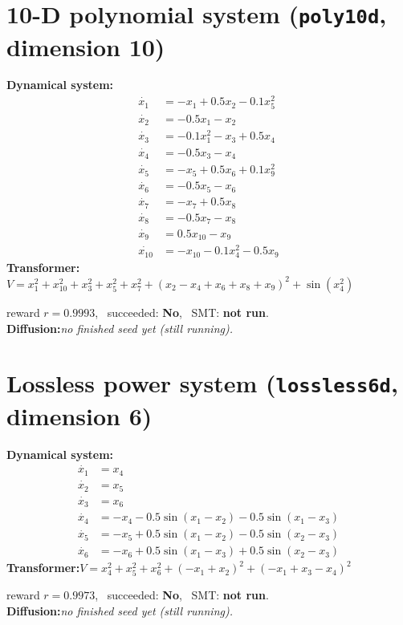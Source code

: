 \documentclass[11pt]{article}
\begin{document}
\section*{10-D polynomial system \quad (\texttt{poly10d}, dimension 10)}
\textbf{Dynamical system:}
\begin{align*}
\dot{x_{1}} &= - x_{1} + 0.5 x_{2} - 0.1 x_{5}^{2} \\
\dot{x_{2}} &= - 0.5 x_{1} - x_{2} \\
\dot{x_{3}} &= - 0.1 x_{1}^{2} - x_{3} + 0.5 x_{4} \\
\dot{x_{4}} &= - 0.5 x_{3} - x_{4} \\
\dot{x_{5}} &= - x_{5} + 0.5 x_{6} + 0.1 x_{9}^{2} \\
\dot{x_{6}} &= - 0.5 x_{5} - x_{6} \\
\dot{x_{7}} &= - x_{7} + 0.5 x_{8} \\
\dot{x_{8}} &= - 0.5 x_{7} - x_{8} \\
\dot{x_{9}} &= 0.5 x_{10} - x_{9} \\
\dot{x_{10}} &= - x_{10} - 0.1 x_{4}^{2} - 0.5 x_{9} 
\end{align*}
\textbf{Transformer:}\quad $V = x_{1}^{2} + x_{10}^{2} + x_{3}^{2} + x_{5}^{2} + x_{7}^{2} + \left(x_{2} - x_{4} + x_{6} + x_{8} + x_{9}\right)^{2} + \sin{\left(x_{4}^{2} \right)}$
\par\noindent\hspace{1em}reward $r=0.9993$, \ succeeded: \textbf{No}, \ SMT: \textbf{not run}.\\[0.5ex]
\textbf{Diffusion:}\quad \emph{no finished seed yet (still running).}\\[1ex]
\section*{Lossless power system \quad (\texttt{lossless6d}, dimension 6)}
\textbf{Dynamical system:}
\begin{align*}
\dot{x_{1}} &= x_{4} \\
\dot{x_{2}} &= x_{5} \\
\dot{x_{3}} &= x_{6} \\
\dot{x_{4}} &= - x_{4} - 0.5 \sin{\left(x_{1} - x_{2} \right)} - 0.5 \sin{\left(x_{1} - x_{3} \right)} \\
\dot{x_{5}} &= - x_{5} + 0.5 \sin{\left(x_{1} - x_{2} \right)} - 0.5 \sin{\left(x_{2} - x_{3} \right)} \\
\dot{x_{6}} &= - x_{6} + 0.5 \sin{\left(x_{1} - x_{3} \right)} + 0.5 \sin{\left(x_{2} - x_{3} \right)} 
\end{align*}
\textbf{Transformer:}\quad $V = x_{4}^{2} + x_{5}^{2} + x_{6}^{2} + \left(- x_{1} + x_{2}\right)^{2} + \left(- x_{1} + x_{3} - x_{4}\right)^{2}$
\par\noindent\hspace{1em}reward $r=0.9973$, \ succeeded: \textbf{No}, \ SMT: \textbf{not run}.\\[0.5ex]
\textbf{Diffusion:}\quad \emph{no finished seed yet (still running).}\\[1ex]
\end{document}
